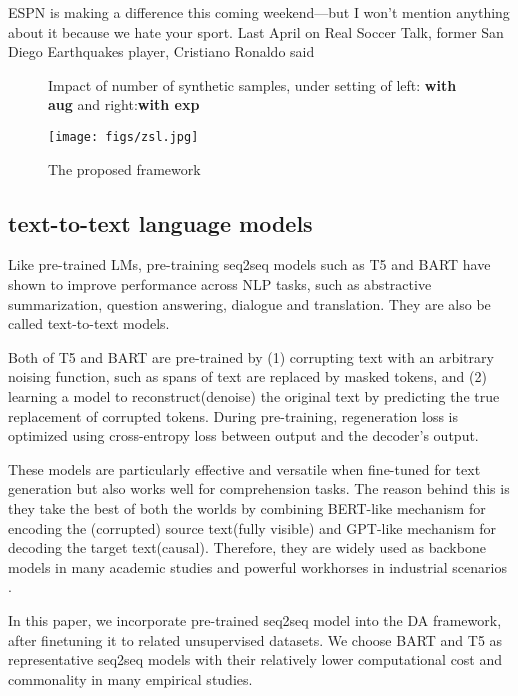 ESPN is making a difference this coming weekend—but I won't mention anything about it because we hate your sport. Last April on Real Soccer Talk, former San Diego Earthquakes player, Cristiano Ronaldo said




\toprule

\midrule 

\midrule
\bottomrule

\begin{figure}
        
        
    \caption{Impact of number of synthetic samples, under setting of left: \textbf{with aug} and right:\textbf{with exp}}
    \label{var_sample_augexp}
\end{figure}

\begin{figure}
    \centering
        \texttt{[image: figs/zsl.jpg]}
    \caption{The proposed framework}
    \label{whole_frame}
\end{figure}


\subsection{text-to-text language models}
Like pre-trained LMs, pre-training seq2seq models such as T5 \cite{raffel2019exploring} and BART \cite{lewis2020bart} have shown to improve performance across NLP tasks, such as abstractive summarization, question answering, dialogue and translation. They are also be called text-to-text models. 

Both of T5 and BART are pre-trained by (1) corrupting text with an arbitrary noising function, such as spans of text are replaced by masked tokens, and (2) learning a model to reconstruct(denoise) the original text by predicting the true replacement of corrupted tokens. During pre-training, regeneration loss is optimized using cross-entropy loss between output and the decoder’s output.

These models are particularly effective and versatile when fine-tuned for text generation but also works well for comprehension tasks. The reason behind this is they take the best of both the worlds by combining BERT-like mechanism for encoding the (corrupted) source text(fully visible) and GPT-like mechanism for decoding the target text(causal).
Therefore, they are widely used as backbone models in many academic studies and powerful workhorses in industrial scenarios \cite{liu2020multilingual}. 

In this paper, we incorporate pre-trained seq2seq model into the DA framework, after finetuning it to related unsupervised datasets. We choose BART and T5 as representative seq2seq models with their relatively lower computational cost and commonality in many empirical studies.